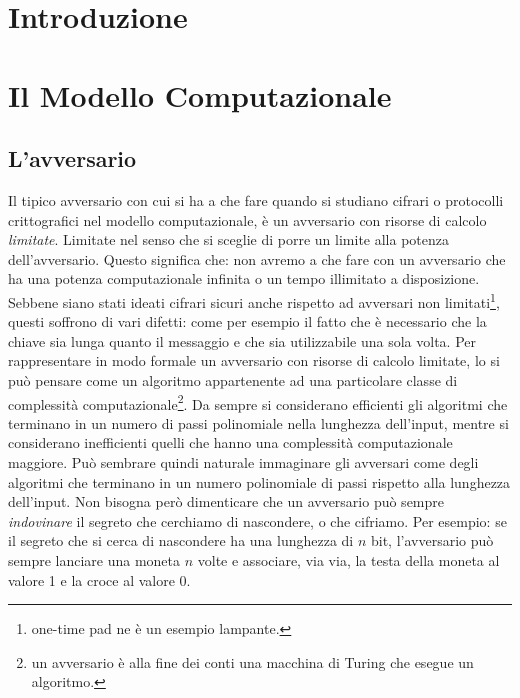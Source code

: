 \documentclass[a4paper,openright,twoside,12pt]{report}
\author{Gian Pietro Farina}
\begin{document}
\chapter*{Introduzione}
\clearpage{\pagestyle{empty}\cleardoublepage}
\chapter{Il Modello Computazionale}
\section{L'avversario}
Il tipico avversario con cui si ha a che fare quando si studiano cifrari o protocolli crittografici nel modello computazionale,
è un avversario con risorse di calcolo \emph{limitate}. Limitate nel senso che si sceglie di porre un limite alla potenza dell'avversario.
Questo significa che: non avremo a che fare con un avversario che ha una potenza computazionale infinita o un tempo illimitato a disposizione.
Sebbene siano stati ideati cifrari sicuri anche rispetto ad avversari non limitati\footnote{one-time pad ne \`e un esempio lampante.}, questi soffrono di vari difetti: come per esempio
il fatto che \`e necessario che la chiave sia lunga quanto il messaggio e che sia utilizzabile una sola volta.
Per rappresentare in modo formale un avversario con risorse di calcolo limitate, lo si può pensare come un algoritmo appartenente ad una 
particolare classe di complessit\`a computazionale\footnote{un avversario \`e alla fine dei conti una macchina di Turing che esegue un algoritmo.}. 
Da sempre si considerano efficienti gli algoritmi che terminano in un numero di passi polinomiale nella lunghezza dell'input, mentre si considerano inefficienti 
quelli che hanno una complessit\`a computazionale maggiore. Pu\`o sembrare quindi naturale immaginare gli avversari come degli algoritmi che terminano in un numero polinomiale di passi
rispetto alla lunghezza dell'input.
Non bisogna per\`o dimenticare che un avversario può sempre \emph{indovinare} il segreto che cerchiamo di nascondere, o che cifriamo. 
Per esempio: se il segreto che si cerca di nascondere ha una lunghezza di $n$ bit, l'avversario può sempre
lanciare una moneta $n$ volte e associare, via via, la testa della moneta al valore 1 e la croce al valore 0.
\end{document}
